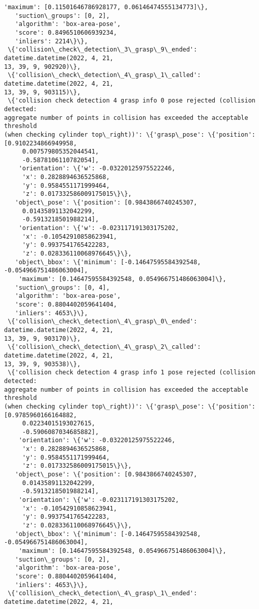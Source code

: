 \documentclass[11pt]{article}
\begin{document}
\begin{tcolorbox}[breakable, size=fbox, boxrule=.5pt, pad at break*=1mm, opacityfill=0]
\begin{Verbatim}[commandchars=\\\{\}]
    'maximum': [0.11501646786928177, 0.06146474555134773]\},
   'suction\_groups': [0, 2],
   'algorithm': 'box-area-pose',
   'score': 0.8496510606939234,
   'inliers': 2214\}\},
 \{'collision\_check\_detection\_3\_grasp\_9\_ended': datetime.datetime(2022, 4, 21,
13, 39, 9, 902920)\},
 \{'collision\_check\_detection\_4\_grasp\_1\_called': datetime.datetime(2022, 4, 21,
13, 39, 9, 903115)\},
 \{'collision check detection 4 grasp info 0 pose rejected (collision detected:
aggregate number of points in collision has exceeded the acceptable threshold
(when checking cylinder top\_right))': \{'grasp\_pose': \{'position':
[0.9102234866949958,
     0.007579805352044541,
     -0.5878106110782054],
    'orientation': \{'w': -0.03220125975522246,
     'x': 0.2828894636525868,
     'y': 0.9584551171999464,
     'z': 0.017332586009175015\}\},
   'object\_pose': \{'position': [0.9843866740245307,
     0.01435891132042299,
     -0.5913218501988214],
    'orientation': \{'w': -0.023117191303175202,
     'x': -0.10542910858623941,
     'y': 0.9937541765422283,
     'z': 0.028336110068976645\}\},
   'object\_bbox': \{'minimum': [-0.14647595584392548, -0.054966751486063004],
    'maximum': [0.14647595584392548, 0.054966751486063004]\},
   'suction\_groups': [0, 4],
   'algorithm': 'box-area-pose',
   'score': 0.8804402059641404,
   'inliers': 4653\}\},
 \{'collision\_check\_detection\_4\_grasp\_0\_ended': datetime.datetime(2022, 4, 21,
13, 39, 9, 903170)\},
 \{'collision\_check\_detection\_4\_grasp\_2\_called': datetime.datetime(2022, 4, 21,
13, 39, 9, 903538)\},
 \{'collision check detection 4 grasp info 1 pose rejected (collision detected:
aggregate number of points in collision has exceeded the acceptable threshold
(when checking cylinder top\_right))': \{'grasp\_pose': \{'position':
[0.9785960166164882,
     0.02234015193027615,
     -0.5906087034685882],
    'orientation': \{'w': -0.03220125975522246,
     'x': 0.2828894636525868,
     'y': 0.9584551171999464,
     'z': 0.017332586009175015\}\},
   'object\_pose': \{'position': [0.9843866740245307,
     0.01435891132042299,
     -0.5913218501988214],
    'orientation': \{'w': -0.023117191303175202,
     'x': -0.10542910858623941,
     'y': 0.9937541765422283,
     'z': 0.028336110068976645\}\},
   'object\_bbox': \{'minimum': [-0.14647595584392548, -0.054966751486063004],
    'maximum': [0.14647595584392548, 0.054966751486063004]\},
   'suction\_groups': [0, 2],
   'algorithm': 'box-area-pose',
   'score': 0.8804402059641404,
   'inliers': 4653\}\},
 \{'collision\_check\_detection\_4\_grasp\_1\_ended': datetime.datetime(2022, 4, 21,

\end{Verbatim}
\end{tcolorbox}
\end{document}
